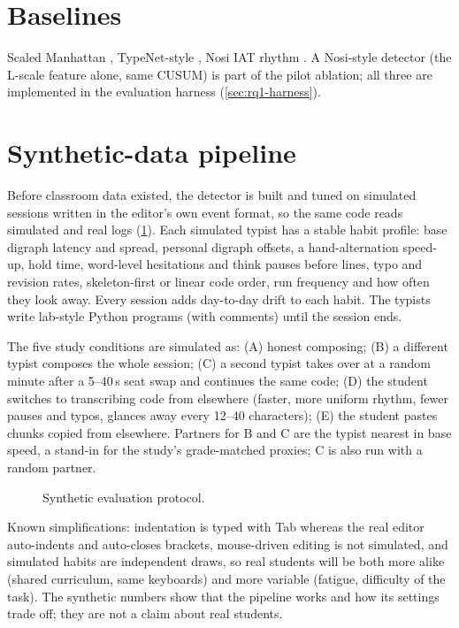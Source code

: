 \section{Baselines}
Scaled Manhattan \cite{killourhy2009comparing}, TypeNet-style
\cite{acien2022typenet}, Nosi IAT rhythm \cite{lueder2026nosi}. A Nosi-style
detector (the L-scale feature alone, same CUSUM) is part of the pilot
ablation; all three are implemented in the evaluation harness
(\cref{sec:rq1-harness}).

\section{Synthetic-data pipeline}
Before classroom data existed, the detector is built and tuned on simulated
sessions written in the editor's own event format, so the same code reads
simulated and real logs (\cref{fig:synthetic-evaluation}). Each simulated
typist has a stable habit profile: base digraph latency and spread,
personal digraph offsets, a hand-alternation speed-up, hold time, word-level
hesitations and think pauses before lines, typo and revision rates,
skeleton-first or linear code order, run frequency and how often they look
away. Every session adds day-to-day drift to each habit. The typists write
lab-style Python programs (with comments) until the session ends.

The five study conditions are simulated as: (A) honest composing; (B) a
different typist composes the whole session; (C) a second typist takes over
at a random minute after a 5--40\,s seat swap and continues the same code;
(D) the student switches to transcribing code from elsewhere (faster, more
uniform rhythm, fewer pauses and typos, glances away every 12--40
characters); (E) the student pastes chunks copied from elsewhere. Partners
for B and C are the typist nearest in base speed, a stand-in for the
study's grade-matched proxies; C is also run with a random partner.

\begin{figure}[ht]
  \centering
  \caption{Synthetic evaluation protocol.}
  \label{fig:synthetic-evaluation}
\end{figure}

Known simplifications: indentation is typed with Tab whereas the real
editor auto-indents and auto-closes brackets, mouse-driven editing is not
simulated, and simulated habits are independent draws, so real students
will be both more alike (shared curriculum, same keyboards) and more
variable (fatigue, difficulty of the task). The synthetic numbers show that
the pipeline works and how its settings trade off; they are not a claim
about real students.
